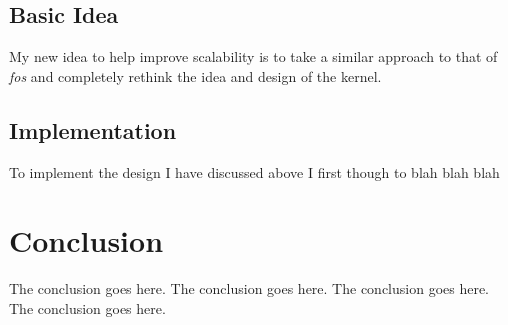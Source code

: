 \documentclass[journal]{IEEEtran}
\begin{document}
\subsection{Basic Idea}
My new idea to help improve scalability is to take a similar approach to that of \emph{fos} \cite{fos} and completely rethink the idea and design of the kernel. 

\subsection{Implementation}

To implement the design I have discussed above I first though to blah blah blah

\section{Conclusion}
The conclusion goes here.
The conclusion goes here.
The conclusion goes here.
The conclusion goes here.




\end{document}
